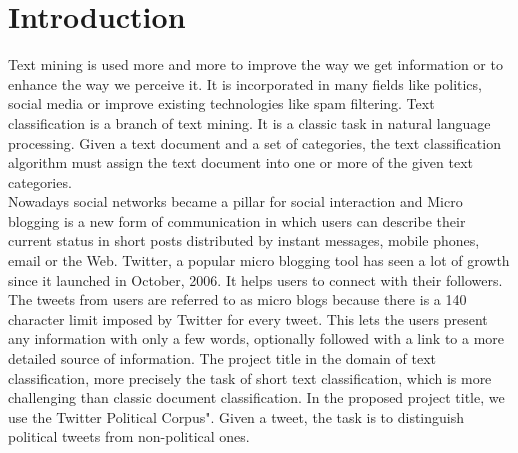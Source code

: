 
\chapter{Introduction} %

\label{Chapter1} %










Text mining is used more and more to improve the way we get information or to enhance the way we perceive it. It is incorporated in many fields like politics, social media or improve existing technologies like spam filtering. Text classification is a branch of text mining. It is a classic task in natural language processing. Given a text document and a set of categories, the text classification algorithm must assign the text document into
one or more of the given text categories.\\
Nowadays social networks became a pillar for social interaction and Micro blogging is a new form of communication in which users can describe their current status in short posts distributed by instant messages, mobile phones, email or the Web. Twitter, a popular micro blogging tool has seen a lot of growth since it launched in October, 2006. It helps users to connect with their followers. The tweets from users are referred to as micro blogs because there is a 140 character limit imposed by Twitter for every tweet. This lets the users present any information with only a few words, optionally followed with a link to a more detailed source of information.
The project title in the domain of text classification, more precisely the task of
short text classification, which is more challenging than classic document classification. In
the proposed project title, we use the Twitter Political Corpus"\cite{website:data_set}. Given a tweet, the task
is to distinguish political tweets from non-political ones.


